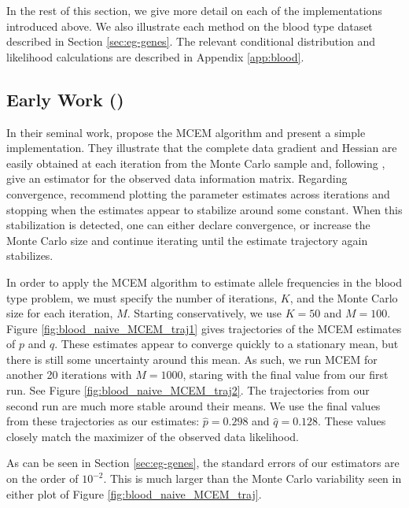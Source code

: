 \documentclass[11pt, oneside]{article}   	%
\begin{document}
In the rest of this section, we give more detail on each of the implementations introduced above. We also illustrate each method on the blood type dataset described in Section \ref{sec:eg-genes}. The relevant conditional distribution and likelihood calculations are described in Appendix \ref{app:blood}.

\subsection{Early Work (\citealp{Wei90})}

In their seminal work, \citet{Wei90} propose the MCEM algorithm and present a simple implementation. They illustrate that the complete data gradient and Hessian are easily obtained at each iteration from the Monte Carlo sample and, following \citet{Lou82}, give an estimator for the observed data information matrix. Regarding convergence, \citeauthor{Wei90} recommend plotting the parameter estimates across iterations and stopping when the estimates appear to stabilize around some constant. When this stabilization is detected, one can either declare convergence, or increase the Monte Carlo size and continue iterating until the estimate trajectory again stabilizes.

In order to apply the MCEM algorithm to estimate allele frequencies in the blood type problem, we must specify the number of iterations, $K$, and the Monte Carlo size for each iteration, $M$. Starting conservatively, we use $K=50$ and $M=100$. Figure \ref{fig:blood_naive_MCEM_traj1} gives trajectories of the MCEM estimates of $p$ and $q$. These estimates appear to converge quickly to a stationary mean, but there is still some uncertainty around this mean. As such, we run MCEM for another 20 iterations with $M=1000$, staring with the final value from our first run. See Figure \ref{fig:blood_naive_MCEM_traj2}. The trajectories from our second run are much more stable around their means. We use the final values from these trajectories as our estimates: $\hat{p} = 0.298$ and $\hat{q} = 0.128$. These values closely match the maximizer of the observed data likelihood. 

As can be seen in Section \ref{sec:eg-genes}, the standard errors of our estimators are on the order of $10^{-2}$. This is much larger than the Monte Carlo variability seen in either plot of Figure \ref{fig:blood_naive_MCEM_traj}.
\end{document}
